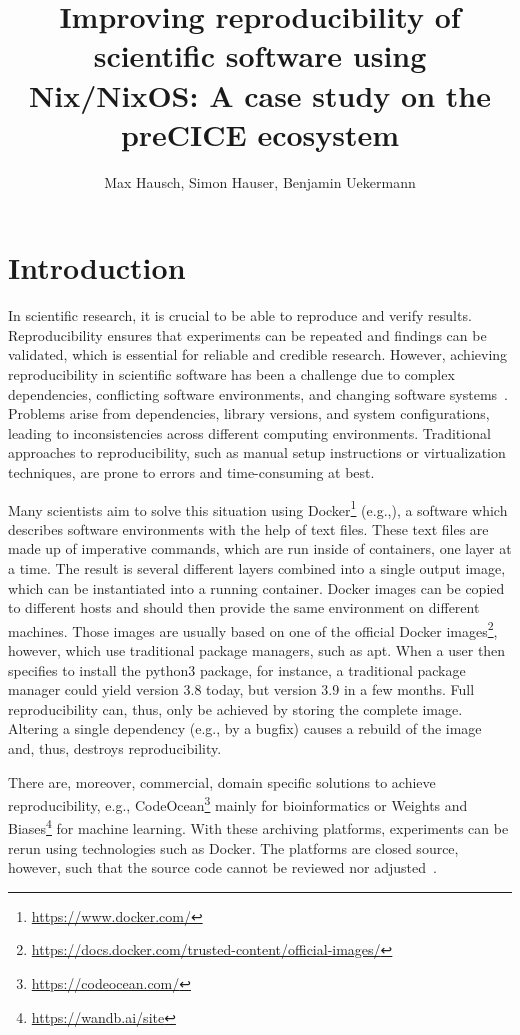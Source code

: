 \documentclass{eceasst}
\title{Improving reproducibility of scientific software using Nix/NixOS: A case study on the preCICE ecosystem}
\author{
Max Hausch\autref{1}\autref{*},
Simon Hauser\autref{1}\autref{*},
Benjamin Uekermann\autref{1}}
\institute{
\autlabel{1} Institute for Parallel and Distributed Systems\\ University of Stuttgart\\ \email{benjamin.uekermann@ipvs.uni-stuttgart.de}\\
\autlabel{*} These authors contributed equally to this work.}
\begin{document}
\maketitle

\section{Introduction}

In scientific research, it is crucial to be able to reproduce and verify results.
Reproducibility ensures that experiments can be repeated and findings can be validated, which is essential for reliable and credible research.
However, achieving reproducibility in scientific software has been a challenge due to complex dependencies, conflicting software environments, and changing software systems~\cite{Dalle_2012}.
Problems arise from dependencies, library versions, and system configurations, leading to inconsistencies across different computing environments.
Traditional approaches to reproducibility, such as manual setup instructions or virtualization techniques, are prone to errors and time-consuming at best.

Many scientists aim to solve this situation using Docker\footnote{\url{https://www.docker.com/}} (e.g.,\cite{koch2023sustainable}),
a software which describes software environments with the help of text files.
These text files are made up of imperative commands, which are run inside of containers, one layer at a time.
The result is several different layers combined into a single output image, which can be instantiated into a running container.
Docker images can be copied to different hosts and should then provide the same environment on different machines.
Those images are usually based on one of the official Docker images\footnote{\url{https://docs.docker.com/trusted-content/official-images/}}, however, which use traditional package managers, such as apt.
When a user then specifies to install the python3 package, for instance, a traditional package manager could yield version 3.8 today, but version 3.9 in a few months.
Full reproducibility can, thus, only be achieved by storing the complete image. Altering a single dependency (e.g., by a bugfix) causes a rebuild of the image and, thus, destroys reproducibility.

There are, moreover, commercial, domain specific solutions to achieve reproducibility, e.g., CodeOcean\footnote{\url{https://codeocean.com/}} mainly for bioinformatics or Weights and Biases\footnote{\url{https://wandb.ai/site}} for machine learning.
With these archiving platforms, experiments can be rerun using technologies such as Docker.
The platforms are closed source, however, such that the source code cannot be reviewed nor adjusted~\cite{koch2023sustainable}.
\end{document}

